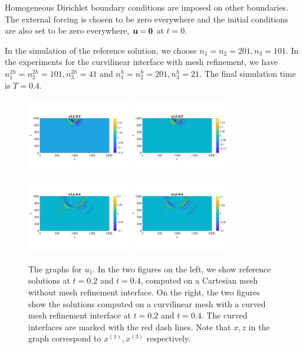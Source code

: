 Homogeneous Dirichlet boundary conditions are imposed on other boundaries. The external forcing is chosen to be zero everywhere and the initial conditions are also set to be zero everywhere, ${\bf u} = {\bf 0}$ at $t = 0$.

In the simulation of the reference solution, we choose $n_1 = n_2 = 201, n_3 = 101$. In the experiments for the curvilinear interface with mesh refinement, we have $n_1^{2h} = n_2^{2h} = 101, n_3^{2h} = 41$ and $n_1^h = n_2^h = 201, n_3^h = 21$. The final simulation time is $T = 0.4$.

\begin{figure}[htbp]
	\centering
	\includegraphics[width=0.4\textwidth,trim={0 2.8cm 0 2.8cm}, clip]{u1_t02_cartesian.png}
	\includegraphics[width=0.4\textwidth,trim={0 2.8cm 0 2.8cm}, clip]{u1_t02_curvi_mr.png}\\
	\includegraphics[width=0.4\textwidth,trim={0 2.8cm 0 2.8cm}, clip]{u1_t04_cartesian.png}
	\includegraphics[width=0.4\textwidth,trim={0 2.8cm 0 2.8cm}, clip]{u1_t04_curvi_mr.png}
\caption{The graphs for $u_1$. In the two figures on the left, we show reference solutions at $t=0.2$ and $t=0.4$, computed on a Cartesian mesh without mesh refinement interface. On the right, the two figures show the solutions computed on a curvilinear mesh with a curved mesh refinement interface at $t=0.2$ and $t=0.4$. The curved interfaces are marked with the red dash lines. Note that $x,z$ in the graph correspond to $x^{(1)}, x^{(3)}$ respectively.}
\label{u1}
\end{figure}

